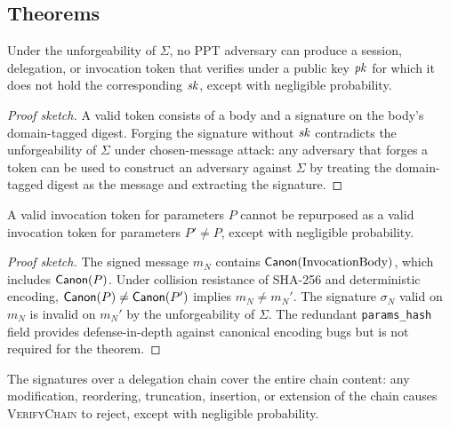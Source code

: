 \documentclass[11pt,a4paper]{article}
\begin{document}
\subsection{Theorems}
\label{sec:security-theorems}

\begin{theorem}
\label{thm:unforgeability}
Under the unforgeability of $\Sigma$, no PPT adversary can produce a
session, delegation, or invocation token that verifies under a public
key $\mathit{pk}$ for which it does not hold the corresponding $\mathit{sk}$, except
with negligible probability.
\end{theorem}

\begin{proof}[Proof sketch]
A valid token consists of a body and a signature on the body's
domain-tagged digest. Forging the signature without $\mathit{sk}$ contradicts
the unforgeability of $\Sigma$ under chosen-message attack: any
adversary that forges a token can be used to construct an adversary
against $\Sigma$ by treating the domain-tagged digest as the message and
extracting the signature.
\end{proof}

\begin{theorem}
\label{thm:parameter-binding}
A valid invocation token for parameters $P$ cannot be repurposed as
a valid invocation token for parameters $P' \neq P$, except with
negligible probability.
\end{theorem}

\begin{proof}[Proof sketch]
The signed message $m_N$ contains $\mathsf{Canon}(\text{InvocationBody})$,
which includes $\mathsf{Canon}(P)$. Under collision resistance of SHA-256 and
deterministic encoding, $\mathsf{Canon}(P) \neq \mathsf{Canon}(P')$ implies $m_N \neq
m_N'$. The signature $\sigma_N$ valid on $m_N$ is invalid on $m_N'$
by the unforgeability of $\Sigma$. The redundant \texttt{params\_hash} field
provides defense-in-depth against canonical encoding bugs but is not
required for the theorem.
\end{proof}

\begin{theorem}
\label{thm:chain-integrity}
The signatures over a delegation chain cover the entire chain content:
any modification, reordering, truncation, insertion, or extension of the
chain causes \textsc{VerifyChain} to reject, except with negligible
probability.
\end{theorem}
\end{document}
